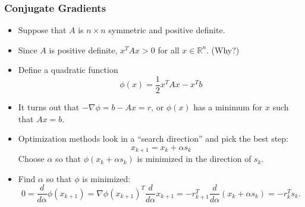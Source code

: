 \documentclass[10pt]{beamer}
\begin{document}
\begin{frame}
\frametitle{Conjugate Gradients}
\begin{itemize}
\item Suppose that $A$ is $n \times n$ symmetric and positive definite. 

\item Since $A$ is positive definite, $x^T A x > 0$ for all $x \in
\mathbb{R}^n$. (Why?)

\item Define a quadratic function
\[
\phi(x) = \frac{1}{2} x^T A x - x^T b
\]

\item It turns out that $- \nabla \phi = b-Ax = r$, or $\phi(x)$ has a minimum for $x$ such that $Ax=b$.

\item Optimization methods look in a ``search direction'' and pick the best
step:
\[
x_{k+1} = x_k + \alpha s_k
\]
Choose $\alpha$ so that $\phi(x_k + \alpha s_k)$ is minimized in the direction
of $s_k$.

\item Find $\alpha$ so that $\phi$ is minimized:
\[
0 = \frac{d}{d\alpha}\phi(x_{k+1}) 
  = \nabla \phi(x_{k+1})^T \frac{d}{d\alpha}x_{k+1} 
 = -r_{k+1}^T \frac{d}{d\alpha}(x_k + \alpha s_k) 
 = -r_k^T s_k.
\]
\end{itemize}
\end{frame}
\end{document}
